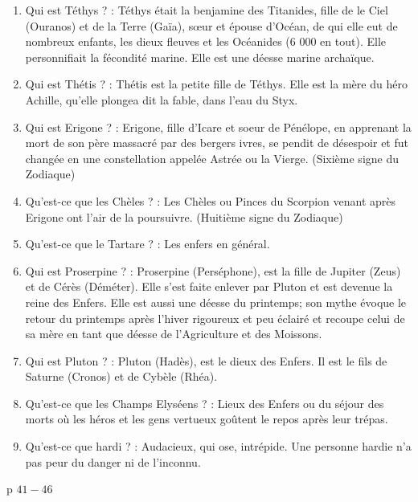 \documentclass[a4paper, 11pt, hidelinks]{article}
\begin{document}
\begin{enumerate}
      \item Qui est Téthys ? : Téthys était la benjamine des Titanides, fille de le Ciel (Ouranos) et de la Terre (Gaïa), sœur et épouse d'Océan, de qui elle eut
            de nombreux enfants, les dieux fleuves et les Océanides (6 000 en tout). Elle personnifiait la fécondité marine. Elle est une déesse marine archaïque.
      \item Qui est Thétis ? : Thétis est la petite fille de Téthys. Elle est la mère du héro Achille, qu'elle plongea dit la fable, dans l'eau du Styx.
      \item Qui est Erigone ? : Erigone, fille d'Icare et soeur de Pénélope, en apprenant la mort de son père massacré par des
            bergers ivres, se pendit de désespoir et fut changée en une constellation appelée Astrée ou la Vierge. (Sixième signe du Zodiaque)
      \item Qu'est-ce que les Chèles ? : Les Chèles ou Pinces du Scorpion venant après Erigone ont l'air de la poursuivre. (Huitième signe du Zodiaque)
      \item Qu'est-ce que le Tartare ? : Les enfers en général.
      \item Qui est Proserpine ? : Proserpine (Perséphone), est la fille de Jupiter (Zeus) et de Cérès (Déméter). Elle s'est faite enlever
            par Pluton et est devenue la reine des Enfers. Elle est aussi une déesse du printemps; son mythe évoque le retour du printemps après l'hiver rigoureux
            et peu éclairé et recoupe celui de sa mère en tant que déesse de l'Agriculture et des Moissons.
      \item Qui est Pluton ? : Pluton (Hadès), est le dieux des Enfers. Il est le fils de Saturne (Cronos) et de Cybèle (Rhéa).
      \item Qu'est-ce que les Champs Elyséens ? : Lieux des Enfers ou du séjour des morts où les héros et les gens vertueux goûtent le repos après leur trépas.
      \item Qu'est-ce que hardi ? : Audacieux, qui ose, intrépide. Une personne hardie n'a pas peur du danger ni de l'inconnu.
\end{enumerate}





p $41 - 46$
\end{document}
